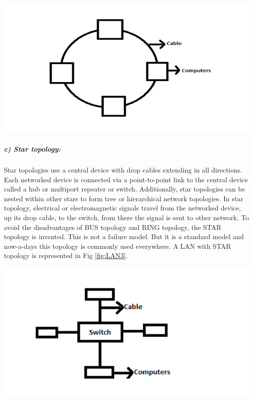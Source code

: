 \documentclass[12pt]{article}
\newenvironment{Figure}
  {\par\medskip\noindent\minipage{\linewidth}}
  {\endminipage\par\medskip}
\begin{document}
\begin{multicols*}{2}
\begin{Figure}
 \centering
 \includegraphics[width=\linewidth]{ring.png}
\label{fig:LAN2}
\end{Figure}

\subparagraph{c) Star topology:}
\indent Star topologies use a central device with drop
cables extending in all directions. Each networked
device is connected via a point-to-point link to the
central device called a hub or multiport repeater or
switch. Additionally, star topologies can be nested
within other stars to form tree or hierarchical network
topologies. In star topology, electrical or
electromagnetic signals travel from the networked
device, up its drop cable, to the switch, from there the
signal is sent to other network. To avoid the
disadvantages of BUS topology and RING topology,
the STAR topology is invented. This is not a failure
model. But it is a standard model and now-a-days this
topology is commonly used everywhere. A LAN with
STAR topology is represented in Fig \ref{fig:LAN3}.

\begin{Figure}
 \centering
 \includegraphics[width=\linewidth]{star.png}
\label{fig:LAN3}
\end{Figure}


\end{multicols*}
\end{document}
